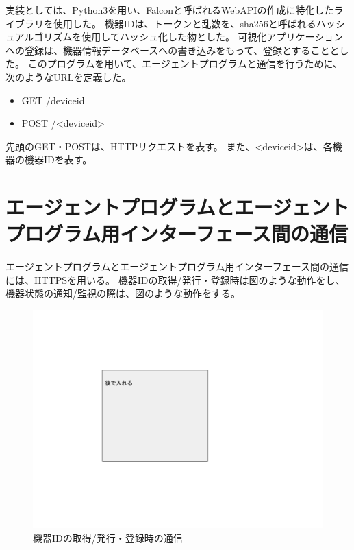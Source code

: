 実装としては、Python3を用い、Falconと呼ばれるWebAPIの作成に特化したライブラリを使用した。
機器IDは、トークンと乱数を、sha256と呼ばれるハッシュアルゴリズムを使用してハッシュ化した物とした。
可視化アプリケーションへの登録は、機器情報データベースへの書き込みをもって、登録とすることとした。
このプログラムを用いて、エージェントプログラムと通信を行うために、次のようなURLを定義した。
\begin{itemize}
	\item GET /deviceid
	\item POST /<deviceid>
\end{itemize}
先頭のGET・POSTは、HTTPリクエストを表す。
また、<deviceid>は、各機器の機器IDを表す。

\section{エージェントプログラムとエージェントプログラム用インターフェース間の通信}
エージェントプログラムとエージェントプログラム用インターフェース間の通信には、HTTPSを用いる。
機器IDの取得/発行・登録時は図のような動作をし、機器状態の通知/監視の際は、図のような動作をする。
\begin{figure}[htbp]
\includegraphics[width=16cm]{images/test.png}
\caption{機器IDの取得/発行・登録時の通信}
\label{fig:inter_program_regist}
\end{figure}
